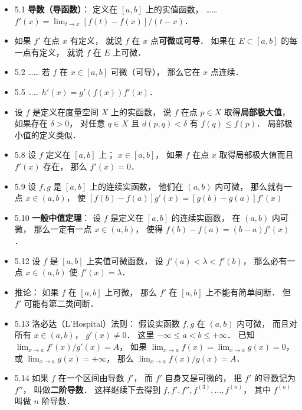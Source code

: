 \begin{itemize}
\item 5.1 \textbf{导数（导函数）}： 定义在 $[a,b]$ 上的实值函数， …… $f'(x) = \lim_{t\to x} [f(t)-f(x)]/(t-x)$．

\item 如果 $f'$ 在点 $x$ 有定义， 就说 $f$ 在 $x$ 点\textbf{可微}或\textbf{可导}． 如果在 $E\subset [a,b]$ 的每一点有定义， 就说 $f$ 在 $E$ 上可微．

\item 5.2 …… 若 $f$ 在 $x\in [a,b]$ 可微（可导）， 那么它在 $x$ 点连续．

\item 5.5 …… $h'(x) = g'(f(x))f'(x)$．

\item 设 $f$ 是定义在度量空间 $X$ 上的实函数， 说 $f$ 在点 $p\in X$ 取得\textbf{局部极大值}， 如果存在 $\delta>0$， 对任意 $q\in X$ 且 $d(p,q)<\delta$ 有 $f(q)\leqslant f(p)$． 局部极小值的定义类似．

\item 5.8 设 $f$ 定义在 $[a,b]$ 上； $x\in [a,b]$， 如果 $f$ 在点 $x$ 取得局部极大值而且 $f'(x)$ 存在， 那么 $f'(x) = 0$．

\item 5.9 设 $f,g$ 是 $[a,b]$ 上的连续实函数， 他们在 $(a,b)$ 内可微， 那么就有一点 $x\in (a,b)$， 使 $[f(b)-f(a)]g'(x) = [g(b)-g(a)]f'(x)$

\item 5.10 \textbf{一般中值定理}： 设 $f$ 是定义在 $[a,b]$ 的连续实函数， 在 $(a,b)$ 内可微， 那么一定有一点 $x\in (a,b)$， 使得 $f(b)-f(a) = (b-a)f'(x)$．

\item 5.12 设 $f$ 是 $[a,b]$ 上实值可微函数， 设 $f'(a)<\lambda<f'(b)$， 那么必有一点 $x\in (a,b)$ 使 $f'(x) = \lambda$．

\item 推论： 如果 $f$ 在 $[a,b]$ 上可微， 那么 $f'$ 在 $[a,b]$ 上不能有简单间断． 但 $f'$ 可能有第二类间断．

\item 5.13 洛必达（L'Hospital）法则： 假设实函数 $f,g$ 在 $(a,b)$ 内可微， 而且对所有 $x\in (a,b)$， $g'(x)\ne 0$． 这里 $-\infty\leqslant a<b\leqslant+\infty$． 已知 $\lim_{x\to a} f'(x)/g'(x) = A$， 如果 $\lim_{x\to a} f(x) = \lim_{x\to a} g(x) = 0$， 或 $\lim_{x\to a} g(x) = +\infty$， 那么 $\lim_{x\to a} f(x)/g(x)= A$．

\item 5.14 如果 $f$ 在一个区间由导数 $f'$， 而 $f'$ 自身又是可微的， 把 $f'$ 的导数记为 $f''$， 叫做\textbf{二阶导数}． 这样继续下去得到 $f, f', f'', f^{(3)},\dots, f^{(n)}$， 其中 $f^{(n)}$ 叫做 $n$ 阶导数．


\end{itemize}
